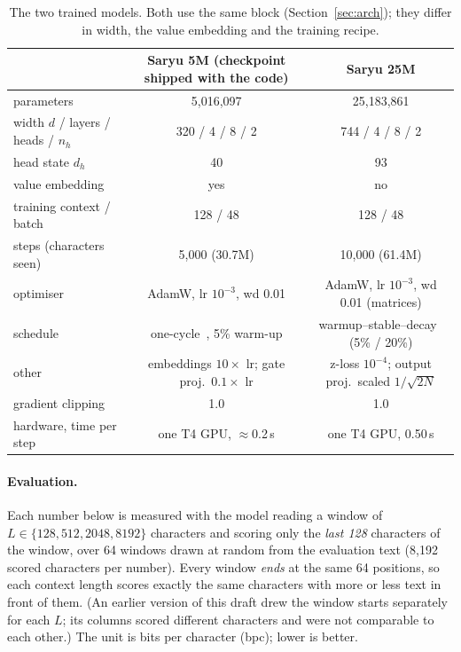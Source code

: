 \documentclass[10pt]{article}
\begin{document}
\begin{table}[t]
\centering
\footnotesize
\begin{tabular}{@{}lcc@{}}
\toprule
 & \textbf{Saryu 5M} (checkpoint shipped with the code) & \textbf{Saryu 25M} \\
\midrule
parameters & 5,016,097 & 25,183,861 \\
width $d$ / layers / heads / $n_h$ & 320 / 4 / 8 / 2 & 744 / 4 / 8 / 2 \\
head state $d_h$ & 40 & 93 \\
value embedding & yes & no \\
training context / batch & 128 / 48 & 128 / 48 \\
steps (characters seen) & 5,000 (30.7M) & 10,000 (61.4M) \\
optimiser & AdamW, lr $10^{-3}$, wd 0.01 & AdamW, lr $10^{-3}$, wd 0.01 (matrices) \\
schedule & one-cycle~\cite{smith2017}, 5\% warm-up & warmup--stable--decay~\cite{wen2024wsd} (5\% / 20\%) \\
other & embeddings $10\times$ lr; gate proj.\ $0.1\times$ lr & z-loss $10^{-4}$; output proj.\ scaled $1/\sqrt{2N}$ \\
gradient clipping & 1.0 & 1.0 \\
hardware, time per step & one T4 GPU, $\approx$0.2\,s & one T4 GPU, 0.50\,s \\
\bottomrule
\end{tabular}
\caption{The two trained models. Both use the same block (Section~\ref{sec:arch}); they differ in width,
the value embedding and the training recipe.}
\label{tab:config}
\end{table}

\paragraph{Evaluation.} Each number below is measured with the model reading a window of
$L\in\{128,512,2048,8192\}$ characters and scoring only the \emph{last 128} characters of the window,
over 64 windows drawn at random from the evaluation text (8,192 scored characters per number). Every
window \emph{ends} at the same 64 positions, so each context length scores exactly the same characters
with more or less text in front of them. (An earlier version of this draft drew the window starts
separately for each $L$; its columns scored different characters and were not comparable to each
other.) The unit is bits per character (bpc); lower is better.
\end{document}
